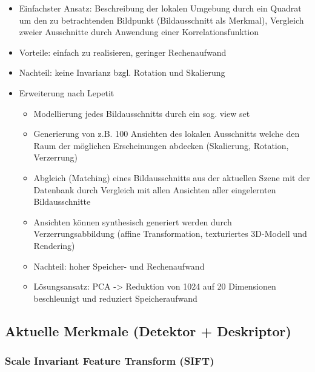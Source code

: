 \documentclass[paper=a4, fontsize=11pt]{scrartcl} %
\numberwithin{equation}{section} %
\numberwithin{figure}{section} %
\numberwithin{table}{section} %
\begin{document}
\begin{itemize}
\item Einfachster Ansatz: Beschreibung der lokalen Umgebung durch ein Quadrat um den zu betrachtenden Bildpunkt (Bildausschnitt als Merkmal), Vergleich zweier Ausschnitte durch Anwendung einer Korrelationsfunktion
\item Vorteile: einfach zu realisieren, geringer Rechenaufwand
\item Nachteil: keine Invarianz bzgl. Rotation und Skalierung
\item Erweiterung nach Lepetit
\begin{itemize}
\item Modellierung jedes Bildausschnitts durch ein sog. view set
\item Generierung von z.B. 100 Ansichten des lokalen Ausschnitts welche den Raum der möglichen Erscheinungen abdecken (Skalierung, Rotation, Verzerrung)
\item Abgleich (Matching) eines Bildausschnitts aus der aktuellen Szene mit der Datenbank durch Vergleich mit allen Ansichten aller eingelernten Bildausschnitte
\item Ansichten können synthesisch generiert werden durch Verzerrungsabbildung (affine Transformation, texturiertes 3D-Modell und Rendering)
\item Nachteil: hoher Speicher- und Rechenaufwand
\item Lösungsansatz: PCA -> Reduktion von 1024 auf 20 Dimensionen beschleunigt und reduziert Speicheraufwand
\end{itemize}
\end{itemize}

\subsection{Aktuelle Merkmale (Detektor + Deskriptor)}

\subsubsection{Scale Invariant Feature Transform (SIFT)}
\end{document}
